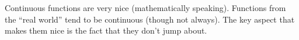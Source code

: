 \begin{eg}
\end{eg}

Continuous functions are very nice (mathematically speaking). Functions
from the ``real world'' tend to be continuous (though not always). The key
aspect that  makes them nice is the fact that they don't jump about.

